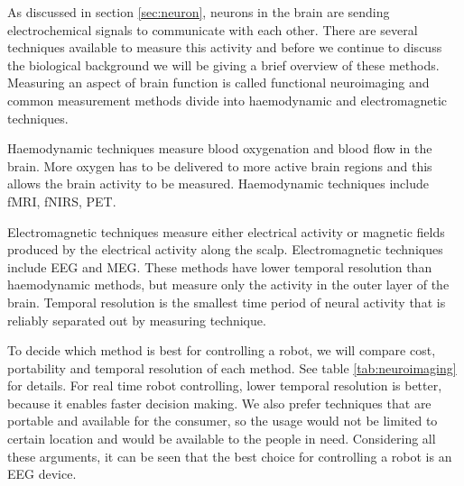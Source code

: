 As discussed in section \ref{sec:neuron}, neurons in the brain are sending electrochemical signals to communicate with each other. There are several techniques available to measure this activity and before we continue to discuss the biological background we will be giving a brief overview of these methods. Measuring an aspect of brain function is called functional neuroimaging and common measurement methods divide into haemodynamic and electromagnetic techniques.

Haemodynamic techniques measure blood oxygenation and blood flow in the brain. More oxygen has to be delivered to more active brain regions and this allows the brain activity to be measured. Haemodynamic techniques include \acrfull{fMRI}, \acrfull{fNIRS}, \acrfull{PET}.

Electromagnetic techniques measure either electrical activity or magnetic fields produced by the electrical activity along the scalp. Electromagnetic techniques include \acrfull{EEG} and \acrfull{MEG}. These methods have lower temporal resolution than haemodynamic methods, but measure only the activity in the outer layer of the brain. Temporal resolution is the smallest time period of neural activity that is reliably separated out by measuring technique.

To decide which method is best for controlling a robot, we will compare cost, portability and temporal resolution of each method. See table \ref{tab:neuroimaging} for details. For real time robot controlling, lower temporal resolution is better, because it enables faster decision making. We also prefer techniques that are portable and available for the consumer, so the usage would not be limited to certain location and would be available to the people in need. Considering all these arguments, it can be seen that the best choice for controlling a robot is an \acrshort{EEG} device.


\newcommand{\pMEG}{\tablefootnote{http://neurogadget.com/2012/12/15/inexpensive-magnetoencephalography-meg-system-could-be-available-at-every-hospital/6495}}
\newcommand{\pfMRI}{\tablefootnote{http://info.blockimaging.com/bid/92623/MRI-Machine-Cost-and-Price-Guide}}
\newcommand{\pPET}{\tablefootnote{http://info.blockimaging.com/bid/68875/How-Much-Does-a-PET-CT-Scanner-Cost}}
\newcommand{\plEEG}{\tablefootnote{http://en.wikipedia.org/wiki/Comparison\_of\_consumer\_brain-computer\_interfaces}}
\newcommand{\phEEG}{\tablefootnote{http://www.brainvision.com/files/actiCHamp-PyCorder-Flyer\_US.pdf}}
\newcommand{\pNIRS}{\cite{NIRS}}
\newcommand{\tresol}{\cite{timeresol}}

